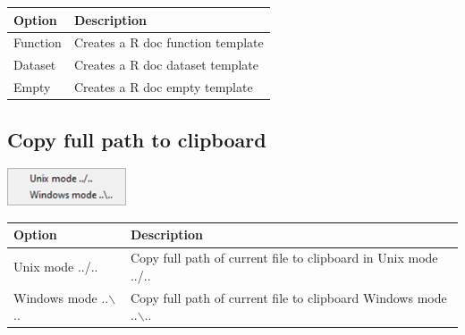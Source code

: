 \begin{scriptsize}
  \begin{tabularx}{\textwidth}{>{\hsize=0.3\hsize}X>{\hsize=0.8\hsize}X}\\
    \hline
    \textbf{Option} & \textbf{Description} \\
    \hline
    Function & Creates a R doc function template \\
    Dataset & Creates a R doc dataset template  \\
    Empty & Creates a R doc empty template \\
    \hline
  \end{tabularx}
\end{scriptsize}


\hypertarget{menu_file_copyfullpath}{}
\subsection{Copy full path to clipboard}

\includegraphics[scale=0.8]{./res/menu_file_copyfullpathtoclipboard.png}\\

\begin{scriptsize}
  \begin{tabularx}{\textwidth}{>{\hsize=0.3\hsize}X>{\hsize=0.8\hsize}X}\\
    \hline
    \textbf{Option} & \textbf{Description} \\
    \hline
    Unix mode ../.. & Copy full path of current file to clipboard in Unix mode ../.. \\
    Windows mode ..$\backslash$.. & Copy full path of current file to clipboard Windows mode ..$\backslash$.. \\
    \hline
  \end{tabularx}
\end{scriptsize}
